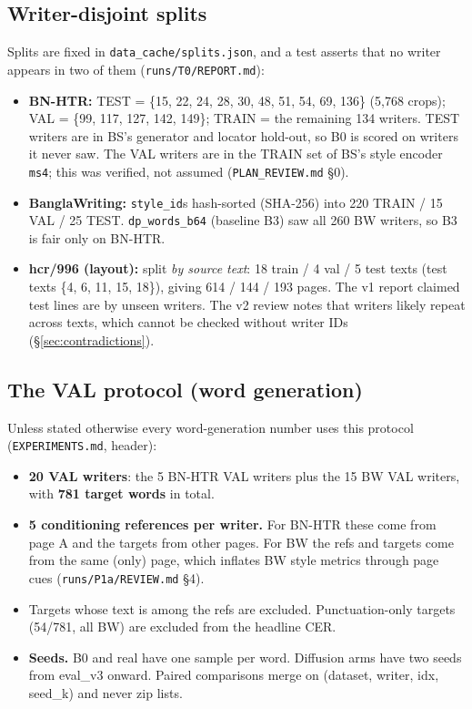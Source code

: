 \documentclass[10.5pt,a4paper]{article}
\newcommand{\fp}[1]{\nolinkurl{#1}}
\begin{document}
\subsection{Writer-disjoint splits}
Splits are fixed in \fp{data_cache/splits.json}, and a test asserts that no writer appears in two of them (\fp{runs/T0/REPORT.md}):
\begin{itemize}
\item \textbf{BN-HTR:} TEST = \{15, 22, 24, 28, 30, 48, 51, 54, 69, 136\} (5,768 crops); VAL = \{99, 117, 127, 142, 149\};
  TRAIN = the remaining 134 writers. TEST writers are in BS's generator and locator hold-out, so B0 is scored on writers it
  never saw. The VAL writers are in the TRAIN set of BS's style encoder \texttt{ms4}; this was verified, not assumed
  (\fp{PLAN_REVIEW.md} \S0).
\item \textbf{BanglaWriting:} \texttt{style\_id}s hash-sorted (SHA-256) into 220 TRAIN / 15 VAL / 25 TEST.
  \texttt{dp\_words\_b64} (baseline B3) saw all 260 BW writers, so B3 is fair only on BN-HTR.
\item \textbf{hcr/996 (layout):} split \emph{by source text}: 18 train / 4 val / 5 test texts (test texts \{4, 6, 11, 15,
  18\}), giving 614 / 144 / 193 pages. The v1 report claimed test lines are by unseen writers. The v2 review notes that
  writers likely repeat across texts, which cannot be checked without writer IDs (\S\ref{sec:contradictions}).
\end{itemize}

\subsection{The VAL protocol (word generation)}
Unless stated otherwise every word-generation number uses this protocol (\fp{EXPERIMENTS.md}, header):
\begin{itemize}
\item \textbf{20 VAL writers}: the 5 BN-HTR VAL writers plus the 15 BW VAL writers, with \textbf{781 target words} in total.
\item \textbf{5 conditioning references per writer.} For BN-HTR these come from page A and the targets from other pages. For
  BW the refs and targets come from the same (only) page, which inflates BW style metrics through page cues
  (\fp{runs/P1a/REVIEW.md} \S4).
\item Targets whose text is among the refs are excluded. Punctuation-only targets (54/781, all BW) are excluded from the
  headline CER.
\item \textbf{Seeds.} B0 and real have one sample per word. Diffusion arms have two seeds from eval\_v3 onward. Paired
  comparisons merge on (dataset, writer, idx, seed\_k) and never zip lists.
\end{itemize}
\end{document}
